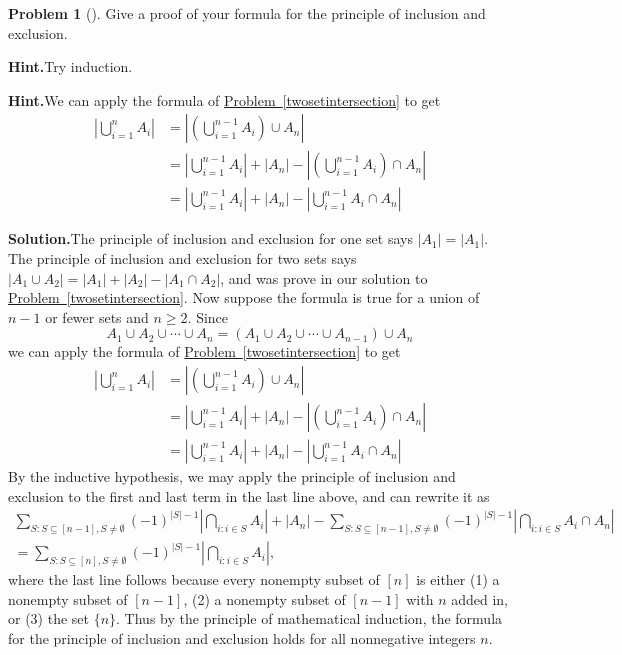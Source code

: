 \documentclass[10pt,]{book}
\theoremstyle{plain}
\theoremstyle{definition}
\newtheorem{activity}[project]{Problem}
\theoremstyle{definition}
\numberwithin{equation}{chapter}
\newcommand{\amp}{&}
\begin{document}
\begin{activity}[]\label{activity-232}
Give a proof of your formula for the principle of inclusion and exclusion.%
\par\medskip\noindent%
\textbf{Hint.}\quad Try induction.%
\par\medskip\noindent%
\textbf{Hint.}\quad We can apply the formula of \hyperref[twosetintersection]{Problem~\ref{twosetintersection}} to get%
\begin{align*}
\left|\bigcup_{i=1}^n A_i \right| \amp = \left|\left(\bigcup_{i=1}^{n-1} A_i\right) \cup A_n \right| \\
\amp = \left| \bigcup_{i=1}^{n-1} A_i\right| + |A_n| - \left|\left( \bigcup_{i=1}^{n-1} A_i\right) \cap A_n\right|\\
\amp = \left| \bigcup_{i=1}^{n-1} A_i\right| + |A_n| - \left|\bigcup_{i=1}^{n-1} A_i \cap A_n\right|
\end{align*}
%
\par\medskip\noindent%
\textbf{Solution.}\quad The principle of inclusion and exclusion for one set says \(|A_1| = |A_1|\).  The principle of inclusion and exclusion for two sets says \(|A_1\cup A_2| = |A_1| + |A_2| - |A_1 \cap A_2|\), and was prove in our solution to \hyperref[twosetintersection]{Problem~\ref{twosetintersection}}.  Now suppose the formula is true for a union of \(n-1\) or fewer sets and \(n \ge 2\).  Since%
\begin{equation*}
A_1 \cup A_2 \cup \cdots \cup A_n = \left(A_1 \cup A_2 \cup \cdots \cup A_{n-1}\right) \cup A_n
\end{equation*}
we can apply the formula of \hyperref[twosetintersection]{Problem~\ref{twosetintersection}} to get%
\begin{align*}
\left|\bigcup_{i=1}^n A_i \right| \amp = \left|\left(\bigcup_{i=1}^{n-1} A_i\right) \cup A_n \right| \\
\amp = \left| \bigcup_{i=1}^{n-1} A_i\right| + |A_n| - \left|\left( \bigcup_{i=1}^{n-1} A_i\right) \cap A_n\right|\\
\amp = \left| \bigcup_{i=1}^{n-1} A_i\right| + |A_n| - \left|\bigcup_{i=1}^{n-1} A_i \cap A_n\right|
\end{align*}
By the inductive hypothesis, we may apply the principle of inclusion and exclusion to the first and last term in the last line above, and can rewrite it as%
\begin{gather*}
\sum_{S:S\subseteq [n-1],S\ne \emptyset} (-1)^{|S|-1}\left|\bigcap_{i:i\in S}A_i \right| + |A_n| - \sum_{S:S\subseteq [n-1],S\ne \emptyset} (-1)^{|S|-1}\left|\bigcap_{i:i\in S}A_i \cap A_n \right|
\\
= \sum_{S:S\subseteq [n],S\ne \emptyset} (-1)^{|S|-1}\left|\bigcap_{i:i\in S}A_i \right|,
\end{gather*}
where the last line follows because every nonempty subset of \([n]\) is either (1) a nonempty subset of \([n-1]\), (2) a nonempty subset of \([n-1]\) with  \(n\) added in, or (3) the set \(\{n\}\).  Thus by the principle of mathematical induction, the formula for the principle of inclusion and exclusion holds for all nonnegative integers \(n\).%
\end{activity}
\end{document}
